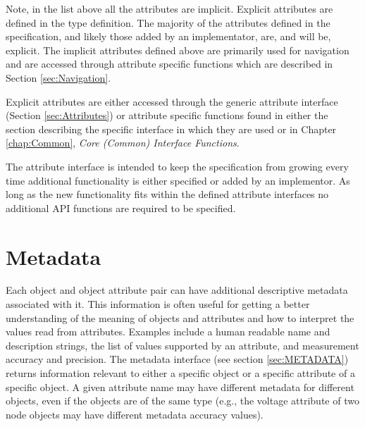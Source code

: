 Note, in the list above all the attributes are implicit. 
Explicit attributes are defined in the  type definition.
The majority of the attributes defined in the specification, and likely those added by an implementator, are, and will be, explicit.
The implicit attributes defined above are primarily used for navigation and are accessed through attribute specific functions which are described in Section \ref{sec:Navigation}.

Explicit attributes are either accessed through the generic attribute interface (Section \ref{sec:Attributes}) or attribute specific functions found in either the section describing the specific interface in which they are used or in Chapter \ref{chap:Common}, \textit{Core (Common) Interface Functions}.

The attribute interface is intended to keep the specification from growing every time additional functionality is either specified or added by an implementor. 
As long as the new functionality fits within the defined attribute interfaces no additional API functions are required to be specified.

\section{Metadata}\label{sec:TheoryMetadata}
Each object and object attribute pair can have additional descriptive metadata associated with it.
This information is often useful for getting a better understanding of the meaning of objects and attributes and how to interpret the values read from attributes.
Examples include a human readable name and description strings, the list of values supported by an attribute, and measurement accuracy and precision.
The metadata interface (see section \ref{sec:METADATA}) returns information relevant to either a specific object or a specific attribute of a specific object.
A given attribute name may have different metadata for different objects, even if the objects are of the same type (e.g., the voltage attribute of two node objects may have different metadata accuracy values).


